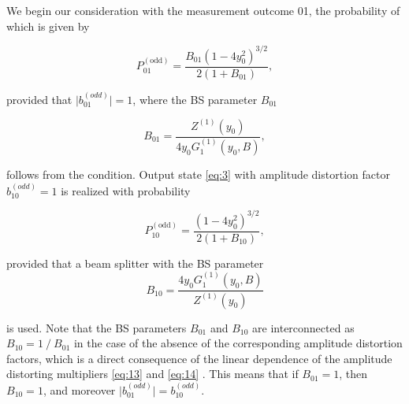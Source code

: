 \documentclass{optica-article}
\begin{document}
We begin our consideration with the measurement outcome 01, the probability of which is given by 


\begin{equation}\label{eq:18}
		P_{01}^{(\text{odd})} = \frac{B_{01}(1-4y_0^2)^{3/2}}{2(1+B_{01})},
\end{equation}

\!\!\!\!\!\!provided that $\lvert b_{01}^{(odd)} \rvert=1$, where the BS parameter $B_{01}$      

\begin{equation}\label{eq:19}
		B_{01} = \frac{Z^{(1)}(y_0)}{4y_0G_1^{(1)}(y_0,B)},
\end{equation}


\!\!\!\!\!\!follows from the condition. Output state \eqref{eq:3}  with amplitude distortion factor $b_{10}^{(odd)}=1$ is realized with probability



\begin{equation}\label{eq:20}
		P_{10}^{(\text{odd})} = \frac{(1-4y_0^2)^{3/2}}{2(1+B_{10})},
\end{equation}


\!\!\!\!\!\!provided that a beam splitter with the BS parameter
\begin{equation}\label{eq:21}
		B_{10} = \frac{4y_0G_1^{(1)}(y_0,B)}{Z^{(1)}(y_0)}
\end{equation}


\!\!\!\!\!\!is used. Note that the BS parameters $B_{01}$ and $B_{10}$ are interconnected as $B_{10}=1⁄B_{01}$  in the case of the absence of the corresponding amplitude distortion factors, which is a direct consequence of the linear dependence of the amplitude distorting multipliers \ref{eq:13}  and \ref{eq:14} . This means that if $B_{01}=1$, then $B_{10}=1$, and moreover $\lvert b_{01}^{(odd)} \rvert =b_{10}^{(odd)} $.     
\end{document}
